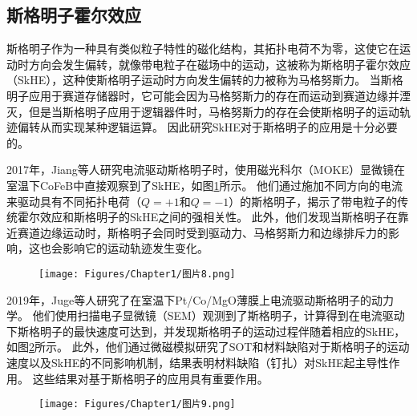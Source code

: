 \subsection{斯格明子霍尔效应}
斯格明子作为一种具有类似粒子特性的磁化结构，其拓扑电荷不为零，这使它在运动时方向会发生偏转，就像带电粒子在磁场中的运动，这被称为斯格明子霍尔效应（SkHE），这种使斯格明子运动时方向发生偏转的力被称为马格努斯力。
当斯格明子应用于赛道存储器时，它可能会因为马格努斯力的存在而运动到赛道边缘并湮灭，但是当斯格明子应用于逻辑器件时，马格努斯力的存在会使斯格明子的运动轨迹偏转从而实现某种逻辑运算。
因此研究SkHE对于斯格明子的应用是十分必要的。\par
2017年，Jiang等人研究电流驱动斯格明子时，使用磁光科尔（MOKE）显微镜在室温下CoFeB中直接观察到了SkHE，如图\ref{图1.8}所示。
他们通过施加不同方向的电流来驱动具有不同拓扑电荷（$Q = +1$和$Q = -1$）的斯格明子，揭示了带电粒子的传统霍尔效应和斯格明子的SkHE之间的强相关性。
此外，他们发现当斯格明子在靠近赛道边缘运动时，斯格明子会同时受到驱动力、马格努斯力和边缘排斥力的影响，这也会影响它的运动轨迹发生变化。
\begin{figure}[h]
    \centering
    \texttt{[image: Figures/Chapter1/图片8.png]}
    \label{图1.8}
\end{figure}\par
2019年，Juge等人研究了在室温下Pt/Co/MgO薄膜上电流驱动斯格明子的动力学。
他们使用扫描电子显微镜（SEM）观测到了斯格明子，计算得到在电流驱动下斯格明子的最快速度可达到，并发现斯格明子的运动过程伴随着相应的SkHE，如图\ref{图1.9}所示。
此外，他们通过微磁模拟研究了SOT和材料缺陷对于斯格明子的运动速度以及SkHE的不同影响机制，结果表明材料缺陷（钉扎）对SkHE起主导性作用。
这些结果对基于斯格明子的应用具有重要作用。
\begin{figure}[htb]
    \centering
    \texttt{[image: Figures/Chapter1/图片9.png]}
    \label{图1.9}
\end{figure}
